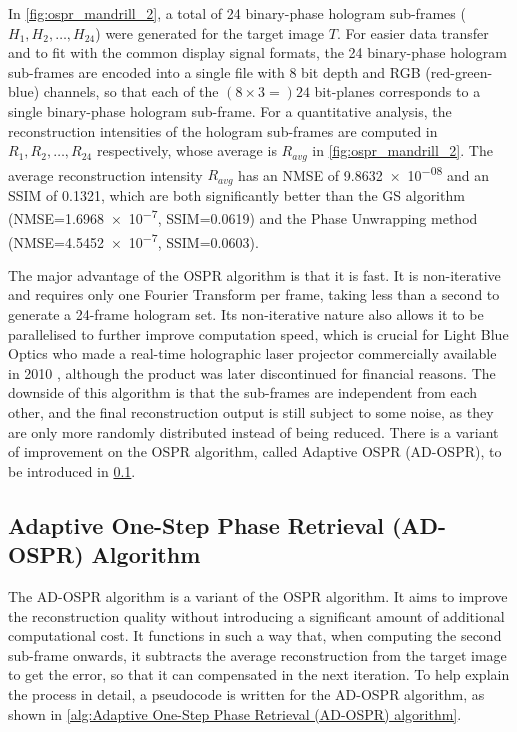 In \cref{fig:ospr_mandrill_2}, a total of 24 binary-phase hologram sub-frames ($H_1, H_2, \ldots, H_{24}$) were generated for the target image $T$. For easier data transfer and to fit with the common display signal formats, the 24 binary-phase hologram sub-frames are encoded into a single file with 8 bit depth and RGB (red-green-blue) channels, so that each of the $(8\times 3 = )24$ bit-planes corresponds to a single binary-phase hologram sub-frame. For a quantitative analysis, the reconstruction intensities of the hologram sub-frames are computed in $R_1, R_2, \ldots, R_{24}$ respectively, whose average is $R_{avg}$ in \cref{fig:ospr_mandrill_2}. The average reconstruction intensity $R_{avg}$ has an NMSE of \num{9.8632e-08} and an SSIM of 0.1321, which are both significantly better than the GS algorithm (NMSE=\num{1.6968e-7}, SSIM=0.0619) and the Phase Unwrapping method (NMSE=\num{4.5452e-7}, SSIM=0.0603).

The major advantage of the OSPR algorithm is that it is fast. It is non-iterative and requires only one Fourier Transform per frame, taking less than a second to generate a 24-frame hologram set. Its non-iterative nature also allows it to be parallelised to further improve computation speed, which is crucial for Light Blue Optics who made a real-time holographic laser projector commercially available in 2010 \cite{Buckley2008}, although the product was later discontinued for financial reasons. The downside of this algorithm is that the sub-frames are independent from each other, and the final reconstruction output is still subject to some noise, as they are only more randomly distributed instead of being reduced. There is a variant of improvement on the OSPR algorithm, called Adaptive OSPR (AD-OSPR), to be introduced in \cref{sec:Adaptive One-Step Phase Retrieval (AD-OSPR) Algorithm}.



\subsection{Adaptive One-Step Phase Retrieval (AD-OSPR) Algorithm}\label{sec:Adaptive One-Step Phase Retrieval (AD-OSPR) Algorithm}

The AD-OSPR algorithm \cite{Kaczorowski2016} is a variant of the OSPR algorithm. It aims to improve the reconstruction quality without introducing a significant amount of additional computational cost. It functions in such a way that, when computing the second sub-frame onwards, it subtracts the average reconstruction from the target image to get the error, so that it can compensated in the next iteration. To help explain the process in detail, a pseudocode is written for the AD-OSPR algorithm, as shown in \cref{alg:Adaptive One-Step Phase Retrieval (AD-OSPR) algorithm}.

